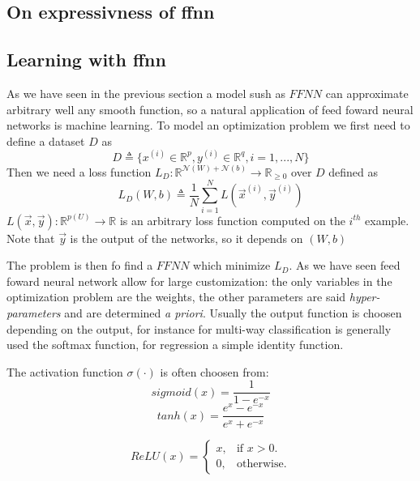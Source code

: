 \subsection{On expressivness of ffnn}
\subsection{Learning with ffnn}

As we have seen in the previous section a model sush as $FFNN$ can approximate arbitrary well any smooth function, so a natural application of feed foward neural networks is machine learning.
To model an optimization problem we first need to define a dataset $D$ as 
\begin{equation}
D\triangleq\{x^{(i)} \in \mathbb{R}^p, y^{(i)} \in \mathbb{R}^q,  i=1,...,N\}
\end{equation}
Then we need a loss function $L_D:\mathbb{R}^{\mathcal{N}(W)+\mathcal{N}(b)} \rightarrow \mathbb{R}_{\geq 0}$ over $D$ defined as
\begin{equation}
L_D(W,b)\triangleq\frac{1}{N}\sum_{i=1}^N L(\vec{x}^{(i)},\vec{y}^{(i)}) 
\end{equation}
$L(\vec{x},\vec{y}):\mathbb{R}^{p(U)} \rightarrow \mathbb{R}$ is an arbitrary loss function computed on the $i^{th}$ example. Note that $\vec{y}$ is the output of the
networks, so it depends on $(W,b)$


The problem is then fo find a $FFNN$ which minimize $L_D$. As we have seen feed foward neural network allow for large customization: the only variables in the optimization problem are the weights, the other
parameters are said \textit{hyper-parameters} and are determined \textit{a priori}. Usually the output function is choosen depending on the output, for instance for multi-way classification
is generally used the softmax function, for regression a simple identity function.

The activation function $\sigma(\cdot)$ is often choosen from:
\begin{equation}
 sigmoid(x)=\frac{1}{1-e^{-x}}
\end{equation}
\begin{equation}
 tanh(x)=\frac{e^x-e^{-x}}{e^x+e^{-x}}
\end{equation}

\begin{equation}
  ReLU(x)=\begin{cases}
    x, & \text{if $x>0$}.\\
    0, & \text{otherwise}.
  \end{cases}
\end{equation}


